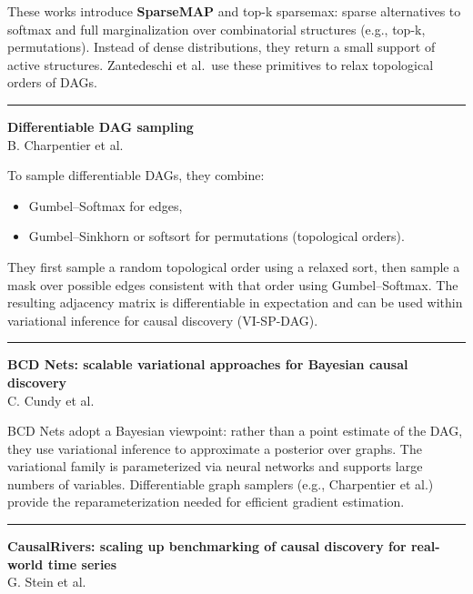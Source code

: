 \documentclass[a5paper]{article}
\providecommand{\tightlist}{%
  \setlength{\itemsep}{0pt}\setlength{\parskip}{0pt}}
\begin{document}
These works introduce \textbf{SparseMAP} and top-k sparsemax: sparse
alternatives to softmax and full marginalization over combinatorial
structures (e.g., top-k, permutations). Instead of dense distributions,
they return a small support of active structures. Zantedeschi et al.~use
these primitives to relax topological orders of DAGs.

\begin{center}\rule{0.5\linewidth}{0.5pt}\end{center}

\textbf{Differentiable DAG sampling}\\
B. Charpentier et al.

To sample differentiable DAGs, they combine:

\begin{itemize}
\tightlist
\item
  Gumbel--Softmax for edges,
\item
  Gumbel--Sinkhorn or softsort for permutations (topological orders).
\end{itemize}

They first sample a random topological order using a relaxed sort, then
sample a mask over possible edges consistent with that order using
Gumbel--Softmax. The resulting adjacency matrix is differentiable in
expectation and can be used within variational inference for causal
discovery (VI-SP-DAG).

\begin{center}\rule{0.5\linewidth}{0.5pt}\end{center}

\textbf{BCD Nets: scalable variational approaches for Bayesian causal
discovery}\\
C. Cundy et al.

BCD Nets adopt a Bayesian viewpoint: rather than a point estimate of the
DAG, they use variational inference to approximate a posterior over
graphs. The variational family is parameterized via neural networks and
supports large numbers of variables. Differentiable graph samplers
(e.g., Charpentier et al.) provide the reparameterization needed for
efficient gradient estimation.

\begin{center}\rule{0.5\linewidth}{0.5pt}\end{center}

\textbf{CausalRivers: scaling up benchmarking of causal discovery for
real-world time series}\\
G. Stein et al.
\end{document}

